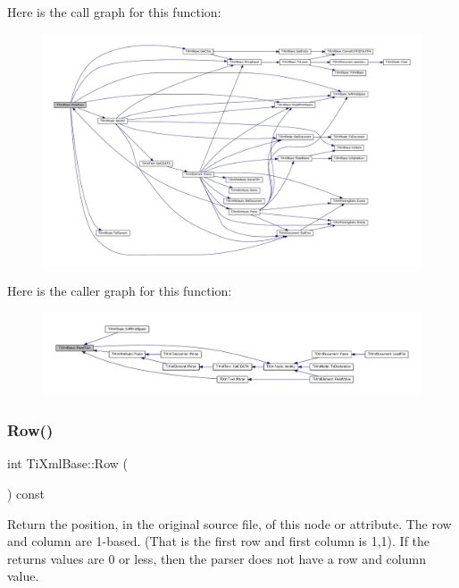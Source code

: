 Here is the call graph for this function\+:\nopagebreak
\begin{figure}[H]
\begin{center}
\leavevmode
\includegraphics[width=350pt]{class_ti_xml_base_aa646c74921aa33156968b802bbf5566e_cgraph}
\end{center}
\end{figure}
Here is the caller graph for this function\+:\nopagebreak
\begin{figure}[H]
\begin{center}
\leavevmode
\includegraphics[width=350pt]{class_ti_xml_base_aa646c74921aa33156968b802bbf5566e_icgraph}
\end{center}
\end{figure}
\mbox{\label{class_ti_xml_base_ad0cacca5d76d156b26511f46080b442e}} 
\subsubsection{\texorpdfstring{Row()}{Row()}}
{\footnotesize\ttfamily int Ti\+Xml\+Base\+::\+Row (\begin{DoxyParamCaption}{ }\end{DoxyParamCaption}) const\hspace{0.3cm}{\ttfamily [inline]}}

Return the position, in the original source file, of this node or attribute. The row and column are 1-\/based. (That is the first row and first column is 1,1). If the returns values are 0 or less, then the parser does not have a row and column value.

